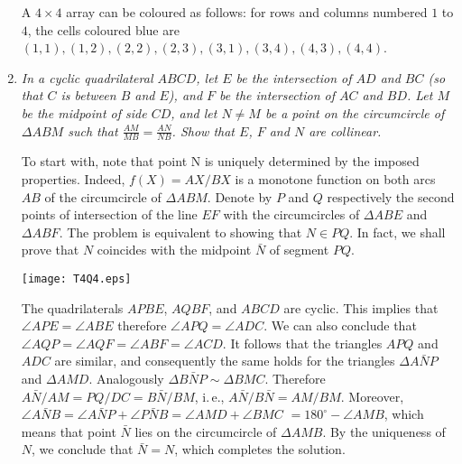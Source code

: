 \documentclass[a4paper,12pt]{article}
\begin{document}
\begin{enumerate}
	A $4\times 4$ array can be coloured as follows: for rows and columns numbered $1$ to $4$, the cells coloured blue are $(1,1),(1,2),(2,2),(2,3),(3,1),(3,4),(4,3),(4,4)$.
	
	\item %
	\textit{In a cyclic quadrilateral $ABCD$, let $E$ be the intersection of $AD$ and $BC$ (so that $C$ is between $B$ and $E$), and $F$ be the intersection of $AC$ and $BD$. Let $M$ be the midpoint of side $CD$, and let $N\neq M$ be a point on the circumcircle of $\Delta ABM$ such that $\frac{AM}{MB}=\frac{AN}{NB}$. Show that $E$, $F$ and $N$ are collinear.}
	
	To start with, note that point N is uniquely determined by the imposed properties. Indeed, $f(X) = AX/BX$ is a monotone function on both arcs $AB$ of the circumcircle of $\Delta ABM$. Denote by $P$ and $Q$ respectively the second points of intersection of the line $EF$ with the circumcircles of $\Delta ABE$ and $\Delta ABF$. The problem is equivalent to showing that $N \in PQ$. In fact, we shall prove that $N$ coincides with the midpoint $\bar{N}$ of segment $PQ$.
	
	\begin{center}\texttt{[image: T4Q4.eps]}\end{center}
	
	The quadrilaterals $APBE$, $AQBF$, and $ABCD$ are cyclic. This implies that $\angle APE = \angle ABE$ therefore $\angle APQ = \angle ADC$. We can also conclude that $\angle AQP = \angle AQF = \angle ABF = \angle ACD$. It follows that the triangles $APQ$ and $ADC$ are similar, and consequently the same holds for the triangles $\Delta A\bar{N}P$ and $\Delta AMD$. Analogously $\Delta B\bar{N}P ∼ \Delta BMC$. Therefore $A\bar{N}/AM = PQ/DC = B\bar{N}/BM$, i.\,e., $A\bar{N}/B\bar{N} = AM/BM$. Moreover, $\angle A\bar{N}B = \angle A\bar{N}P + \angle P\bar{N}B = \angle AMD + \angle BMC$ $= 180^\circ - \angle AMB$, which means that point $\bar{N}$ lies on the circumcircle of $\Delta AMB$. By
the uniqueness of $N$, we conclude that $\bar{N} = N$, which completes the solution.

\end{enumerate}
\end{document}
